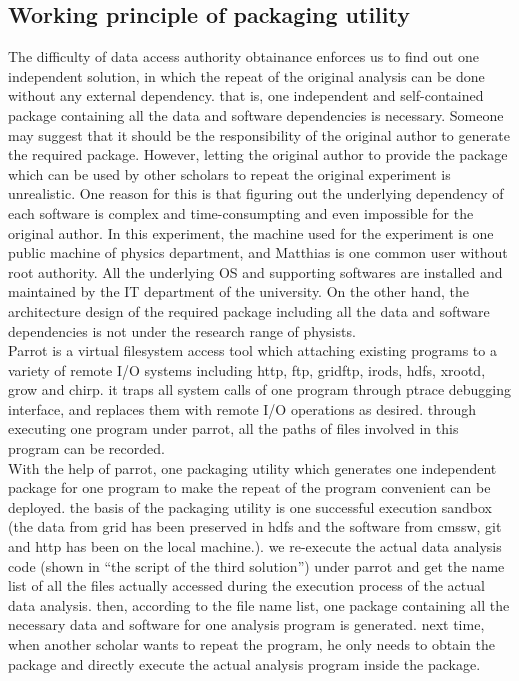 \documentclass{article}
\begin{document}
\subsection{Working principle of packaging utility}
\indent The difficulty of data access authority obtainance enforces us to find out one independent solution, in which the repeat of the original analysis can be done without any external dependency. that is, one independent and self-contained package containing all the data and software dependencies is necessary. Someone may suggest that it should be the responsibility of the original author to generate the required package. However, letting the original author to provide the package which can be used by other scholars to repeat the original experiment is unrealistic. One reason for this is that figuring out the underlying dependency of each software is complex and time-consumpting and even impossible for the original author. In this experiment, the machine used for the experiment is one public machine of physics department, and Matthias is one common user without root authority. All the underlying OS and supporting softwares are installed and maintained by the IT department of the university. On the other hand, the architecture design of the required package including all the data and software dependencies is not under the research range of physists.\\ 

Parrot is a virtual filesystem access tool which attaching existing programs to a variety of remote I/O systems including http, ftp, gridftp, irods, hdfs, xrootd, grow and chirp. it traps all system calls of one program through ptrace debugging interface, and replaces them with remote I/O operations as desired. through executing one program under parrot, all the paths of files involved in this program can be recorded.\\

With the help of parrot, one packaging utility which generates one independent package for one program to make the repeat of the program convenient can be deployed. the basis of the packaging utility is one successful execution sandbox (the data from grid has been preserved in hdfs and the software from cmssw, git and http has been on the local machine.). we re-execute the actual data analysis code (shown in “the script of the third solution”) under parrot and get the name list of all the files actually accessed during the execution process of the actual data analysis. then, according to the file name list, one package containing all the necessary data and software for one analysis program is generated. next time, when another scholar wants to repeat the program, he only needs to obtain the package and directly execute the actual analysis program inside the package.\\
\end{document}
